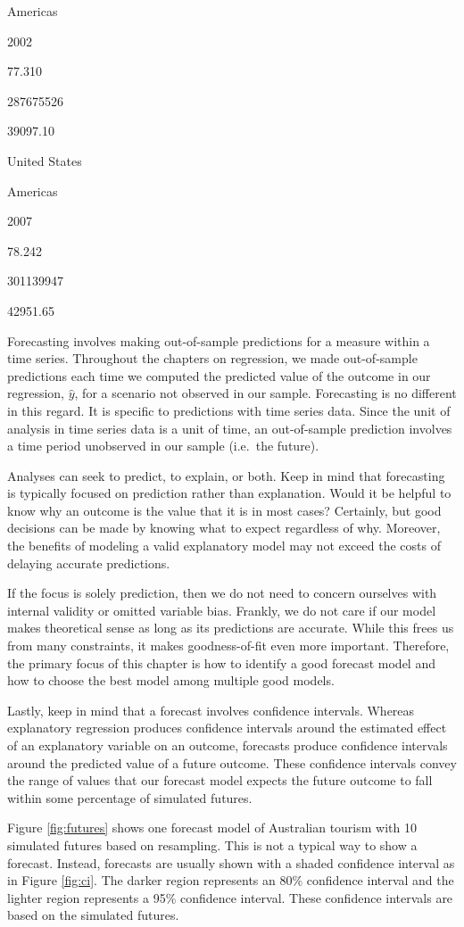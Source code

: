 \documentclass[
]{book}
\begin{document}
Americas

2002

77.310

287675526

39097.10

United States

Americas

2007

78.242

301139947

42951.65

Forecasting involves making out-of-sample predictions for a measure within a time series. Throughout the chapters on regression, we made out-of-sample predictions each time we computed the predicted value of the outcome in our regression, \(\hat{y}\), for a scenario not observed in our sample. Forecasting is no different in this regard. It is specific to predictions with time series data. Since the unit of analysis in time series data is a unit of time, an out-of-sample prediction involves a time period unobserved in our sample (i.e.~the future).

Analyses can seek to predict, to explain, or both. Keep in mind that forecasting is typically focused on prediction rather than explanation. Would it be helpful to know why an outcome is the value that it is in most cases? Certainly, but good decisions can be made by knowing what to expect regardless of why. Moreover, the benefits of modeling a valid explanatory model may not exceed the costs of delaying accurate predictions.

If the focus is solely prediction, then we do not need to concern ourselves with internal validity or omitted variable bias. Frankly, we do not care if our model makes theoretical sense as long as its predictions are accurate. While this frees us from many constraints, it makes goodness-of-fit even more important. Therefore, the primary focus of this chapter is how to identify a good forecast model and how to choose the best model among multiple good models.

Lastly, keep in mind that a forecast involves confidence intervals. Whereas explanatory regression produces confidence intervals around the estimated effect of an explanatory variable on an outcome, forecasts produce confidence intervals around the predicted value of a future outcome. These confidence intervals convey the range of values that our forecast model expects the future outcome to fall within some percentage of simulated futures.

Figure \ref{fig:futures} shows one forecast model of Australian tourism with 10 simulated futures based on resampling. This is not a typical way to show a forecast. Instead, forecasts are usually shown with a shaded confidence interval as in Figure \ref{fig:ci}. The darker region represents an 80\% confidence interval and the lighter region represents a 95\% confidence interval. These confidence intervals are based on the simulated futures.
\end{document}
